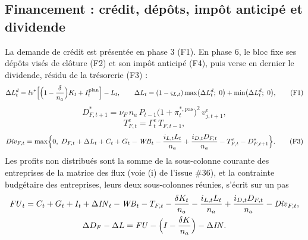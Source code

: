 \documentclass[11pt,a4paper]{article}
\begin{document}
\subsection{Financement : crédit, dépôts, impôt anticipé et dividende}
\label{sec:investissement-financement}
\begin{proposee}
La demande de crédit est présentée en phase 3 (F1). En phase 6, le bloc fixe ses dépôts visés de clôture (F2) et son impôt anticipé (F4), puis verse en dernier le dividende, résidu de la trésorerie (F3) :
\begin{equation*}
\Delta L^d_t = \mathit{lv}^\ast \Bigl[\Bigl(1 - \frac{\delta}{n_a}\Bigr) K_t + I^{\mathrm{plan}}_t\Bigr] - L_t, \qquad \Delta L_t = (1 - \varsigma_{L,t}) \max\bigl(\Delta L^d_t ;\ 0\bigr) + \min\bigl(\Delta L^d_t ;\ 0\bigr), \tag{F1}
\end{equation*}
\begin{equation*}
D^\ast_{F,t+1} = \nu_F\, n_a\, P_{t-1}\bigl(1 + \pi^{\ast,\mathrm{pas}}_t\bigr)^2\, v^e_{j,t+1}, \tag{F2}
\end{equation*}
\begin{equation*}
T^e_{F,t} = \Gamma^e_t\, T_{F,t-1}, \tag{F4}
\end{equation*}
\begin{equation*}
\mathit{Div}_{F,t} = \max\Bigl\{0,\; D_{F,t} + \Delta L_t + C_t + G_t - \mathit{WB}_t - \frac{i_{L,t} L_t}{n_a} + \frac{i_{D,t} D_{F,t}}{n_a} - T^e_{F,t} - D^\ast_{F,t+1}\Bigr\} . \tag{F3}
\end{equation*}
Les profits non distribués sont la somme de la sous-colonne courante des entreprises de la matrice des flux (voie (i) de l'issue \#36), et la contrainte budgétaire des entreprises, leurs deux sous-colonnes réunies, s'écrit sur un pas
\begin{gather*}
\mathit{FU}_t = C_t + G_t + I_t + \Delta\mathit{IN}_t - \mathit{WB}_t - T_{F,t} - \frac{\delta K_t}{n_a} - \frac{i_{L,t} L_t}{n_a} + \frac{i_{D,t} D_{F,t}}{n_a} - \mathit{Div}_{F,t}, \\
\Delta D_F - \Delta L = \mathit{FU} - \Bigl(I - \frac{\delta K}{n_a}\Bigr) - \Delta\mathit{IN} .
\end{gather*}


\end{proposee}
\end{document}
